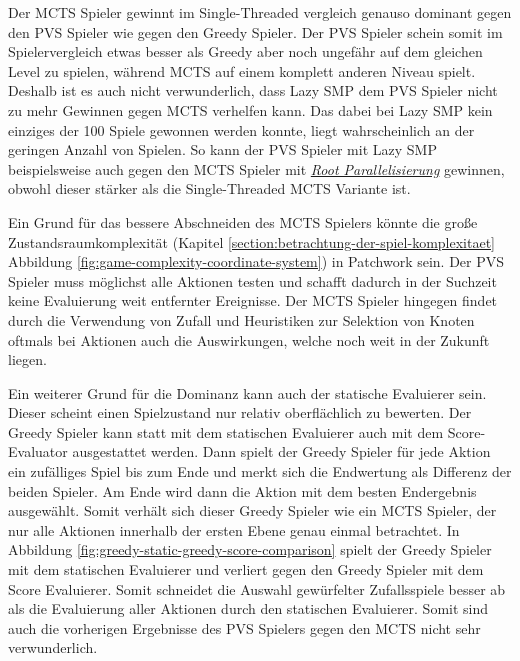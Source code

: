 Der \ac{MCTS} Spieler gewinnt im Single-Threaded vergleich genauso dominant gegen den \ac{PVS} Spieler wie gegen den Greedy Spieler. Der \ac{PVS} Spieler schein somit im Spielervergleich etwas besser als Greedy aber noch ungefähr auf dem gleichen Level zu spielen, während \ac{MCTS} auf einem komplett anderen Niveau spielt. Deshalb ist es auch nicht verwunderlich, dass Lazy \ac{SMP} dem \ac{PVS} Spieler nicht zu mehr Gewinnen gegen \ac{MCTS} verhelfen kann. Das dabei bei Lazy \ac{SMP} kein einziges der 100 Spiele gewonnen werden konnte, liegt wahrscheinlich an der geringen Anzahl von Spielen. So kann der \ac{PVS} Spieler mit Lazy \ac{SMP} beispielsweise auch gegen den \ac{MCTS} Spieler mit \hyperref[text:root-parallelization]{\emph{Root Parallelisierung}} gewinnen, obwohl dieser stärker als die Single-Threaded \ac{MCTS} Variante ist.

Ein Grund für das bessere Abschneiden des \ac{MCTS} Spielers könnte die große Zustandsraumkomplexität (Kapitel \ref{section:betrachtung-der-spiel-komplexitaet} Abbildung \ref{fig:game-complexity-coordinate-system}) in Patchwork sein. Der \ac{PVS} Spieler muss möglichst alle Aktionen testen und schafft dadurch in der Suchzeit keine Evaluierung weit entfernter Ereignisse. Der \ac{MCTS} Spieler hingegen findet durch die Verwendung von Zufall und Heuristiken zur Selektion von Knoten oftmals bei Aktionen auch die Auswirkungen, welche noch weit in der Zukunft liegen.

Ein weiterer Grund für die Dominanz kann auch der statische Evaluierer sein. Dieser scheint einen Spielzustand nur relativ oberflächlich zu bewerten. Der Greedy Spieler kann statt mit dem statischen Evaluierer auch mit dem Score-Evaluator ausgestattet werden. Dann spielt der Greedy Spieler für jede Aktion ein zufälliges Spiel bis zum Ende und merkt sich die Endwertung als Differenz der beiden Spieler. Am Ende wird dann die Aktion mit dem besten Endergebnis ausgewählt. Somit verhält sich dieser Greedy Spieler wie ein \ac{MCTS} Spieler, der nur alle Aktionen innerhalb der ersten Ebene genau einmal betrachtet. In Abbildung \ref{fig:greedy-static-greedy-score-comparison} spielt der Greedy Spieler mit dem statischen Evaluierer und verliert gegen den Greedy Spieler mit dem Score Evaluierer. Somit schneidet die Auswahl gewürfelter Zufallsspiele besser ab als die Evaluierung aller Aktionen durch den statischen Evaluierer. Somit sind auch die vorherigen Ergebnisse des \ac{PVS} Spielers gegen den \ac{MCTS} nicht sehr verwunderlich.

